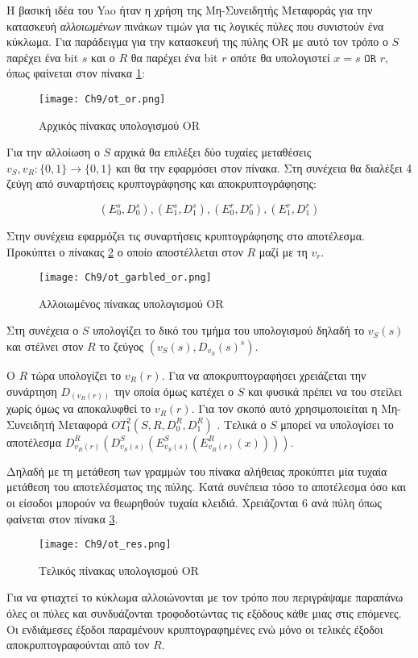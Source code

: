 Η βασική ιδέα του Yao ήταν η χρήση της Μη-Συνειδητής Μεταφοράς για την κατασκευή \emph{αλλοιωμένων} πινάκων τιμών για τις λογικές πύλες που συνιστούν ένα κύκλωμα. Για παράδειγμα για την κατασκευή της πύλης OR με αυτό τον τρόπο ο $S$ παρέχει ένα bit $s$ και ο $R$ θα παρέχει ένα bit $r$ οπότε θα υπολογιστεί $x = s$ $\mathtt{OR}$ $r$, όπως φαίνεται στον πίνακα \ref{fig:OT_OR}:

\begin{figure}
	\centering
		\texttt{[image: Ch9/ot\_or.png]}
	\caption{Αρχικός πίνακας υπολογισμού OR}
	\label{fig:OT_OR}
\end{figure}

Για την αλλοίωση ο $S$ αρχικά θα επιλέξει δύο τυχαίες μεταθέσεις $v_S, v_R : \{0,1\} \rightarrow \{0,1\} $ και θα την εφαρμόσει στον πίνακα. Στη συνέχεια θα διαλέξει 4 ζεύγη από συναρτήσεις κρυπτογράφησης και αποκρυπτογράφησης:

 $$(E_0^s, D_0^s), (E_1^s, D_1^s), (E_0^r, D_0^r), (E_1^r, D_1^r)$$ 
 
 Στην συνέχεια εφαρμόζει τις συναρτήσεις κρυπτογράφησης στο αποτέλεσμα. Προκύπτει ο πίνακας \ref{fig:ot_garbled_or} ο οποίο αποστέλλεται στον $R$ μαζί με τη $v_r$.
 
 \begin{figure}
	\centering
		\texttt{[image: Ch9/ot\_garbled\_or.png]}
	\caption{Αλλοιωμένος πίνακας υπολογισμού OR}
	\label{fig:ot_garbled_or}
\end{figure}

Στη συνέχεια ο $S$ υπολογίζει το δικό του τμήμα του υπολογισμού δηλαδή το $v_S(s)$ και στέλνει στον $R$ το ζεύγος $(v_S(s),D_{v_S}(s)^s)$.

O $R$ τώρα υπολογίζει το $v_R(r)$. Για να αποκρυπτογραφήσει χρειάζεται την συνάρτηση $D_(v_R(r))$ την οποία όμως κατέχει ο $S$ και φυσικά πρέπει να του στείλει χωρίς όμως να αποκαλυφθεί το $v_R(r)$. Για τον σκοπό αυτό χρησιμοποιείται η Μη-Συνειδητή Μεταφορά ${OT}_1^2(S,R,D_0^R,D_1^R)$ \label{OT_ex1}. Τελικά ο $S$ μπορεί να υπολογίσει το αποτέλεσμα $D^R_{v_R(r)}(D^S_{v_S(s)}(E^S_{v_S(s)}(E^R_{v_R(r)}(x)))) $.

Δηλαδή με τη μετάθεση των γραμμών του πίνακα αλήθειας προκύπτει μία τυχαία μετάθεση του αποτελέσματος της πύλης. Κατά συνέπεια τόσο το αποτέλεσμα όσο και οι είσοδοι μπορούν να θεωρηθούν τυχαία κλειδιά. Χρειάζονται 6 ανά πύλη όπως φαίνεται στον πίνακα \ref{fig:ot_res}.

 \begin{figure}
	\centering
		\texttt{[image: Ch9/ot\_res.png]}
	\caption{Τελικός πίνακας υπολογισμού OR}
	\label{fig:ot_res}
\end{figure}

Για να φτιαχτεί το κύκλωμα αλλοιώνονται με τον τρόπο που περιγράψαμε παραπάνω όλες οι πύλες και συνδυάζονται τροφοδοτώντας τις εξόδους κάθε μιας στις επόμενες. Οι ενδιάμεσες έξοδοι παραμένουν κρυπτογραφημένες ενώ μόνο οι τελικές έξοδοι αποκρυπτογραφούνται από τον $R$.






